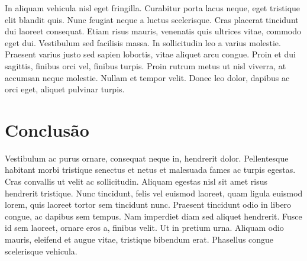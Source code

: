 \documentclass[12pt]{article}
\begin{document}
In aliquam vehicula nisl eget fringilla. Curabitur porta lacus neque, eget tristique elit blandit quis. Nunc feugiat neque a luctus scelerisque. Cras placerat tincidunt dui laoreet consequat. Etiam risus mauris, venenatis quis ultrices vitae, commodo eget dui. Vestibulum sed facilisis massa. In sollicitudin leo a varius molestie. Praesent varius justo sed sapien lobortis, vitae aliquet arcu congue. Proin et dui sagittis, finibus orci vel, finibus turpis. Proin rutrum metus ut nisl viverra, at accumsan neque molestie. Nullam et tempor velit. Donec leo dolor, dapibus ac orci eget, aliquet pulvinar turpis.


\section{Conclusão}

Vestibulum ac purus ornare, consequat neque in, hendrerit dolor. Pellentesque habitant morbi tristique senectus et netus et malesuada fames ac turpis egestas. Cras convallis ut velit ac sollicitudin. Aliquam egestas nisl sit amet risus hendrerit tristique. Nunc tincidunt, felis vel euismod laoreet, quam ligula euismod lorem, quis laoreet tortor sem tincidunt nunc. Praesent tincidunt odio in libero congue, ac dapibus sem tempus. Nam imperdiet diam sed aliquet hendrerit. Fusce id sem laoreet, ornare eros a, finibus velit. Ut in pretium urna. Aliquam odio mauris, eleifend et augue vitae, tristique bibendum erat. Phasellus congue scelerisque vehicula.




\end{document}
